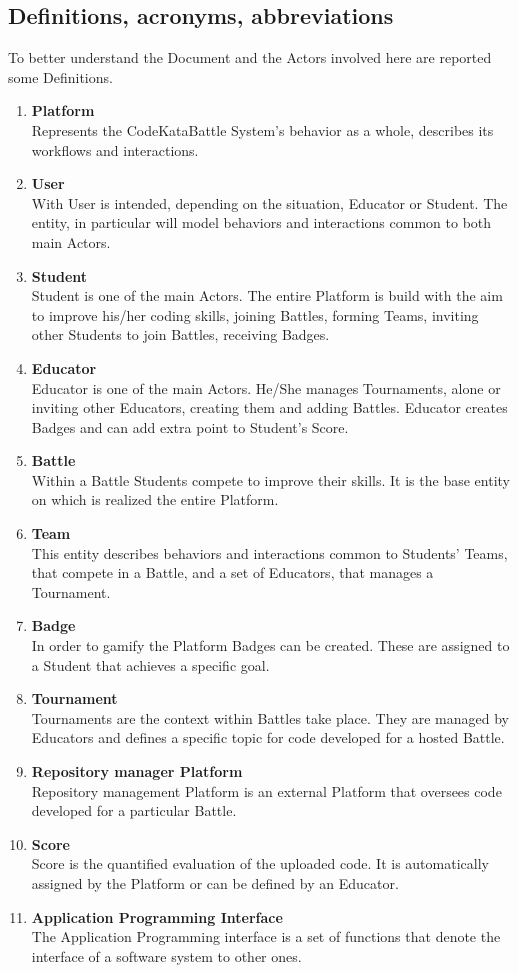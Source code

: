 \subsection{Definitions, acronyms, abbreviations}
To better understand the Document and the Actors involved here are reported some Definitions.
\begin{enumerate}[label=$\bullet$]
    \item \textbf{Platform}\\Represents the CodeKataBattle System's behavior as a whole, describes its workflows and interactions.
    \item \textbf{User}\\With User is intended, depending on the situation, Educator or Student. The entity, in particular will model behaviors and interactions common to both main Actors.
    \item \textbf{Student}\\Student is one of the main Actors. The entire Platform is build with the aim to improve his/her coding skills, joining Battles, forming Teams, inviting other Students to join Battles, receiving Badges.
    \item \textbf{Educator}\\Educator is one of the main Actors. He/She manages Tournaments, alone or inviting other Educators, creating them and adding Battles. Educator creates Badges and can add extra point to Student's Score.
    \item \textbf{Battle}\\Within a Battle Students compete to improve their skills. It is the base entity on which is realized the entire Platform.
    \item \textbf{Team}\\This entity describes behaviors and interactions common to Students' Teams, that compete in a Battle, and a set of Educators, that manages a Tournament.
    \item \textbf{Badge}\\In order to gamify the Platform Badges can be created. These are assigned to a Student that achieves a specific goal.
    \item \textbf{Tournament}\\Tournaments are the context within Battles take place. They are managed by Educators and defines a specific topic for code developed for a hosted Battle.
    \item \textbf{Repository manager Platform}\\Repository management Platform is an external Platform that oversees code developed for a particular Battle.
    \item \textbf{Score}\\Score is the quantified evaluation of the uploaded code. It is automatically assigned by the Platform or can be defined by an Educator.
    \item \textbf{Application Programming Interface}\\ The Application Programming interface is a set of functions that denote the interface of a software system to other ones.
\end{enumerate}

